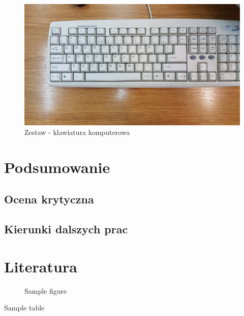 \documentclass[a4paper]{report}
\begin{document}
	\begin{figure}[h!]
				\centering
				\includegraphics[width=1.0\textwidth]{zestaw_klawiatura.jpg}
				\caption{Zestaw - klawiatura komputerowa}
	\end{figure}	
		
	
\chapter{Podsumowanie}
	\section{Ocena krytyczna}	
	\section{Kierunki dalszych prac}
	
\chapter{Literatura}

\begin{figure}
	\caption{Sample figure}
\end{figure}
		
\begin{table}
	\caption{Sample table}
\end{table}

\begin{appendix}
	\listoffigures
	\listoftables
\end{appendix}
\end{document}
